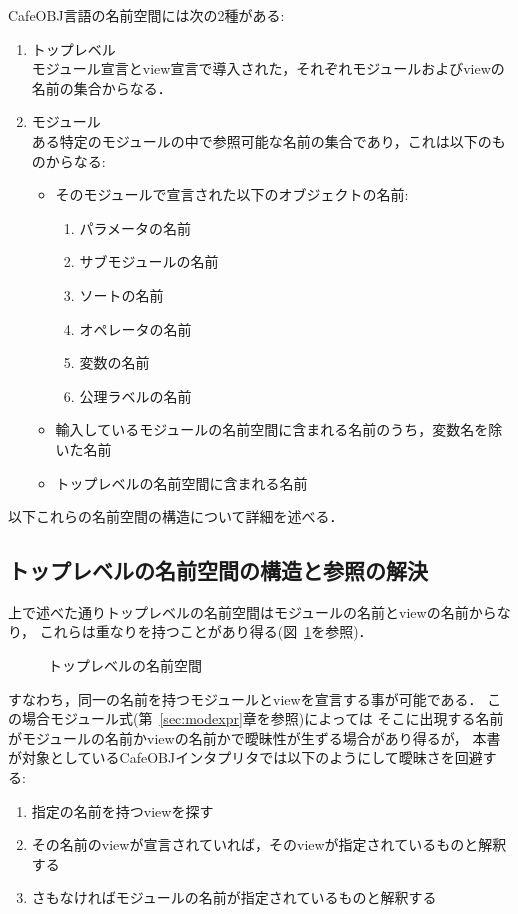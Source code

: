 \documentclass[a4paper,oneside,10pt]{memoir}
\begin{document}
CafeOBJ言語の名前空間には次の2種がある:
\begin{enumerate}
\item トップレベル\\
  モジュール宣言とview宣言で導入された，それぞれモジュールおよびviewの名前の集合からなる．
\item モジュール\\
  ある特定のモジュールの中で参照可能な名前の集合であり，これは以下のものからなる:
  \begin{itemize}
    \item そのモジュールで宣言された以下のオブジェクトの名前:
      \begin{enumerate}
      \item パラメータの名前
      \item サブモジュールの名前
      \item ソートの名前
      \item オペレータの名前
      \item 変数の名前
      \item 公理ラベルの名前
      \end{enumerate}
    \item 輸入しているモジュールの名前空間に含まれる名前のうち，変数名を除いた名前
    \item トップレベルの名前空間に含まれる名前
  \end{itemize}
\end{enumerate}

以下これらの名前空間の構造について詳細を述べる．

\subsection{トップレベルの名前空間の構造と参照の解決}
\label{sec:toplevel-name-space}
上で述べた通りトップレベルの名前空間はモジュールの名前とviewの名前からなり，
これらは重なりを持つことがあり得る(図~\ref{fig:toplevel}を参照)．

\begin{figure}[H]
\begin{center}
  
\caption{トップレベルの名前空間}
\label{fig:toplevel}
\end{center}
\end{figure}

すなわち，同一の名前を持つモジュールとviewを宣言する事が可能である．
この場合モジュール式(第~\ref{sec:modexpr}章を参照)によっては
そこに出現する名前がモジュールの名前かviewの名前かで曖昧性が生ずる場合があり得るが，
本書が対象としているCafeOBJインタプリタでは以下のようにして曖昧さを回避する:
\begin{enumerate}
\item 指定の名前を持つviewを探す
\item その名前のviewが宣言されていれば，そのviewが指定されているものと解釈する
\item さもなければモジュールの名前が指定されているものと解釈する
\end{enumerate}
\end{document}
